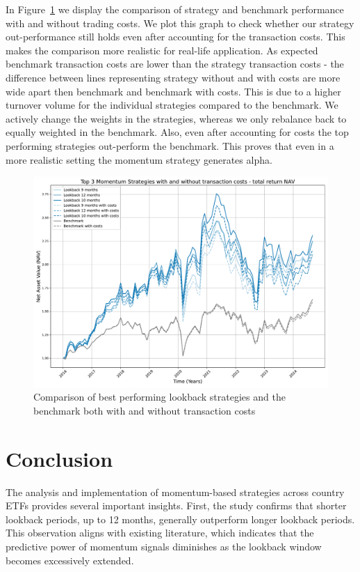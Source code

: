 \documentclass[a4paper,12pt,twoside]{article}
\begin{document}
In Figure~\ref{fig:costs} we display the comparison of strategy and benchmark performance with and without trading costs. We plot this graph to check whether our strategy out-performance still holds even after accounting for the transaction costs. This makes the comparison more realistic for real-life application. As expected benchmark transaction costs are lower than the strategy transaction costs - the difference between lines representing strategy without and with costs are more wide apart then benchmark and benchmark with costs. This is due to a higher turnover volume for the individual strategies compared to the benchmark. We actively change the weights in the strategies, whereas we only rebalance back to equally weighted in the benchmark. Also, even after accounting for costs the top performing strategies out-perform the benchmark. This proves that even in a more realistic setting the momentum strategy generates alpha.

\begin{figure}[h]
    \centering
    \includegraphics[width=15cm]{figures/fig_costs.pdf}
    \caption{Comparison of best performing lookback strategies and the benchmark both with and without transaction costs}
    \label{fig:costs}
\end{figure}



\clearpage
\newpage
\section{Conclusion}

The analysis and implementation of momentum-based strategies across country ETFs provides several important insights. First, the study confirms that shorter lookback periods, up to 12 months, generally outperform longer lookback periods. This observation aligns with existing literature, which indicates that the predictive power of momentum signals diminishes as the lookback window becomes excessively extended.
\end{document}
